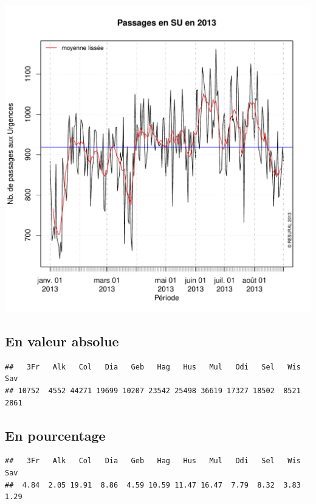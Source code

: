 \documentclass[12pt,english,french,twoside]{report}\usepackage[]{graphicx}\usepackage[]{color}
\makeatletter
\def\maxwidth{ %
  \ifdim\Gin@nat@width>\linewidth
    \linewidth
  \else
    \Gin@nat@width
  \fi
}
\newenvironment{kframe}{%
 \def\at@end@of@kframe{}%
 \ifinner\ifhmode%
  \def\at@end@of@kframe{\end{minipage}}%
  \begin{minipage}{\columnwidth}%
 \fi\fi%
 \def\FrameCommand##1{\hskip\@totalleftmargin \hskip-\fboxsep
 \colorbox{shadecolor}{##1}\hskip-\fboxsep
     \hskip-\linewidth \hskip-\@totalleftmargin \hskip\columnwidth}%
 \MakeFramed {\advance\hsize-\width
   \@totalleftmargin\z@ \linewidth\hsize
   \@setminipage}}%
 {\par\unskip\endMakeFramed%
 \at@end@of@kframe}
\newenvironment{knitrout}{}{} %
\makeatother
\begin{document}
\begin{knitrout}
\color{fgcolor}
\includegraphics[width=\maxwidth]{figure/activite_plot2} 

\end{knitrout}


\subsection*{En valeur absolue}
\begin{knitrout}
\color{fgcolor}\begin{kframe}
\begin{verbatim}
##   3Fr   Alk   Col   Dia   Geb   Hag   Hus   Mul   Odi   Sel   Wis   Sav 
## 10752  4552 44271 19699 10207 23542 25498 36619 17327 18502  8521  2861
\end{verbatim}
\end{kframe}
\end{knitrout}


\subsection*{En pourcentage}
\begin{knitrout}
\color{fgcolor}\begin{kframe}
\begin{verbatim}
##   3Fr   Alk   Col   Dia   Geb   Hag   Hus   Mul   Odi   Sel   Wis   Sav 
##  4.84  2.05 19.91  8.86  4.59 10.59 11.47 16.47  7.79  8.32  3.83  1.29
\end{verbatim}
\end{kframe}
\end{knitrout}
\end{document}

